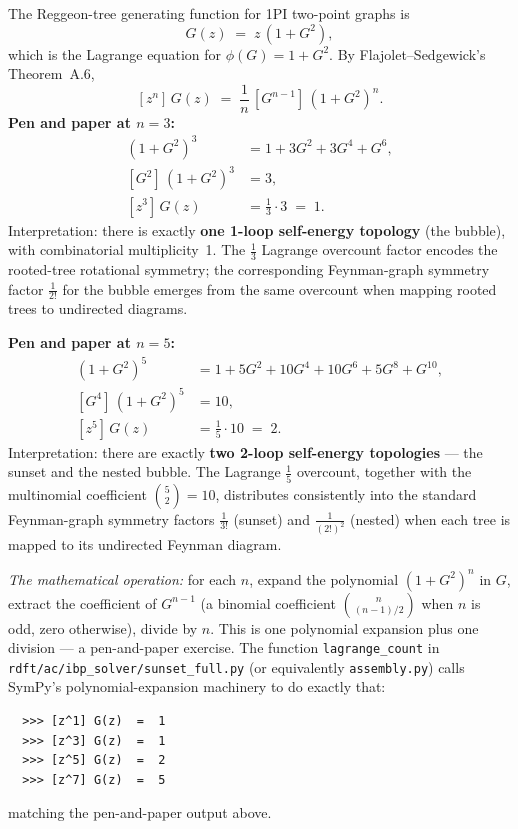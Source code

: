 \documentclass[11pt,a4paper]{article}
\theoremstyle{definition}
\theoremstyle{plain}
\begin{document}
\begin{cfacbox}
The Reggeon-tree generating function for 1PI two-point graphs is
\begin{equation}\label{eq:dse-walk}
  G(z) \;=\; z\,(1 + G^2),
\end{equation}
which is the Lagrange equation for $\phi(G) = 1 + G^2$.  By
Flajolet--Sedgewick's Theorem~A.6,
\begin{equation}\label{eq:lagrange-walk}
  [z^n]\,G(z) \;=\; \frac{1}{n}\,[G^{n-1}]\,(1+G^2)^n.
\end{equation}
\textbf{Pen and paper at $n = 3$:}
\begin{align*}
  (1+G^2)^3 &= 1 + 3 G^2 + 3 G^4 + G^6,\\
  [G^2]\,(1+G^2)^3 &= 3,\\
  [z^3]\,G(z) &= \tfrac{1}{3}\cdot 3 \;=\; 1.
\end{align*}
Interpretation: there is exactly \textbf{one 1-loop self-energy
topology} (the bubble), with combinatorial multiplicity~1.  The
$\tfrac{1}{3}$ Lagrange overcount factor encodes the rooted-tree
rotational symmetry; the corresponding Feynman-graph symmetry factor
$\tfrac{1}{2!}$ for the bubble emerges from the same overcount when
mapping rooted trees to undirected diagrams.

\textbf{Pen and paper at $n = 5$:}
\begin{align*}
  (1+G^2)^5 &= 1 + 5G^2 + 10 G^4 + 10 G^6 + 5 G^8 + G^{10},\\
  [G^4]\,(1+G^2)^5 &= 10,\\
  [z^5]\,G(z) &= \tfrac{1}{5}\cdot 10 \;=\; 2.
\end{align*}
Interpretation: there are exactly \textbf{two 2-loop self-energy
topologies} --- the sunset and the nested bubble.  The Lagrange
$\tfrac{1}{5}$ overcount, together with the multinomial coefficient
$\binom{5}{2} = 10$, distributes consistently into the standard
Feynman-graph symmetry factors $\tfrac{1}{3!}$ (sunset) and
$\tfrac{1}{(2!)^2}$ (nested) when each tree is mapped to its
undirected Feynman diagram.
\end{cfacbox}

\begin{codebox}
\emph{The mathematical operation:} for each $n$, expand the polynomial
$(1 + G^2)^n$ in $G$, extract the coefficient of $G^{n-1}$ (a
binomial coefficient $\binom{n}{(n-1)/2}$ when $n$ is odd, zero
otherwise), divide by $n$.  This is one polynomial expansion plus
one division --- a pen-and-paper exercise.  The function
\texttt{lagrange\_count} in
\texttt{rdft/ac/ibp\_solver/sunset\_full.py} (or equivalently
\texttt{assembly.py}) calls SymPy's polynomial-expansion machinery
to do exactly that:
\begin{verbatim}
  >>> [z^1] G(z)  =  1
  >>> [z^3] G(z)  =  1
  >>> [z^5] G(z)  =  2
  >>> [z^7] G(z)  =  5
\end{verbatim}
matching the pen-and-paper output above.
\end{codebox}
\end{document}
